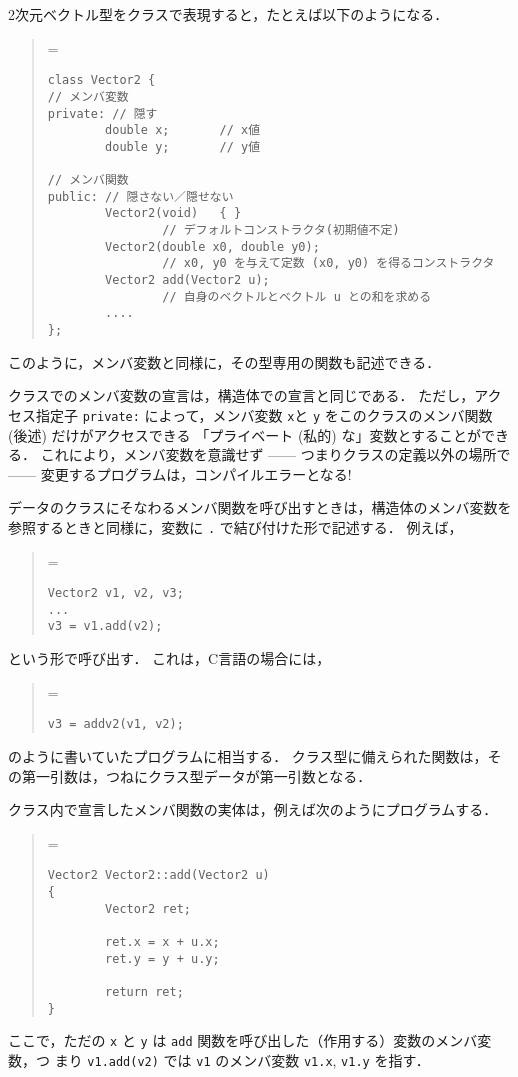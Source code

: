 \documentclass[11pt,a4,epsf]{jarticle}
\def\linesparpage#1{\baselineskip=\textheight\divide\baselineskip#1}
\begin{document}
2次元ベクトル型をクラスで表現すると，たとえば以下のようになる．
\begin{quote}
\linesparpage{50}
\begin{verbatim}
class Vector2 {
// メンバ変数
private: // 隠す
        double x;       // x値
        double y;       // y値

// メンバ関数
public: // 隠さない／隠せない
        Vector2(void)   { }
                // デフォルトコンストラクタ(初期値不定)
        Vector2(double x0, double y0);
                // x0, y0 を与えて定数 (x0, y0) を得るコンストラクタ
        Vector2 add(Vector2 u);
                // 自身のベクトルとベクトル u との和を求める
        ....
};
\end{verbatim}
\end{quote}
このように，メンバ変数と同様に，その型専用の関数も記述できる．

クラスでのメンバ変数の宣言は，構造体での宣言と同じである．
ただし，アクセス指定子 \verb+private:+ によって，メンバ変数 \verb+x+と
\verb+y+ をこのクラスのメンバ関数 (後述) だけがアクセスできる
「プライベート (私的) な」変数とすることができる．
これにより，メンバ変数を意識せず ------ 
つまりクラスの定義以外の場所で ------ 変更するプログラムは，コンパイルエラーとなる!

データのクラスにそなわるメンバ関数を呼び出すときは，構造体のメンバ変数を参照するときと同様に，変数に \verb+.+ で結び付けた形で記述する．
例えば，
\begin{quote}
\linesparpage{50}
\begin{verbatim}
Vector2 v1, v2, v3;
...
v3 = v1.add(v2);
\end{verbatim}
\end{quote}
という形で呼び出す．
これは，C言語の場合には，
\begin{quote}
\linesparpage{50}
\begin{verbatim}
v3 = addv2(v1, v2);
\end{verbatim}
\end{quote}
のように書いていたプログラムに相当する．
クラス型に備えられた関数は，その第一引数は，つねにクラス型データが第一引数となる．

クラス内で宣言したメンバ関数の実体は，例えば次のようにプログラムする．
\begin{quote}
\linesparpage{50}
\begin{verbatim}
Vector2 Vector2::add(Vector2 u)
{
        Vector2 ret;

        ret.x = x + u.x;
        ret.y = y + u.y;

        return ret;
}
\end{verbatim}
\end{quote}
ここで，ただの \verb+x+ と \verb+y+ は
 \verb+add+ 関数を呼び出した（作用する）変数のメンバ変数，つ
まり \verb+v1.add(v2)+ では \verb+v1+ のメンバ変数 \verb+v1.x+,
\verb+v1.y+ を指す．
\end{document}
